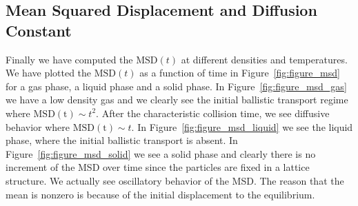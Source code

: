 \documentclass[twoside]{article}
\begin{document}
\subsection{Mean Squared Displacement and Diffusion Constant}
Finally we have computed the $\mathrm{MSD}(t)$ at different densities and temperatures. We have plotted the $\mathrm{MSD}(t)$ as a function of time in Figure~\ref{fig:figure_msd} for a gas phase, a liquid phase and a solid phase. In Figure~\ref{fig:figure_msd_gas} we have a low density gas and we clearly see the initial ballistic transport regime where $\mathrm{MSD(t)} \sim t^2$. After the characteristic collision time, we see diffusive behavior where $\mathrm{MSD(t)} \sim t$. In Figure~\ref{fig:figure_msd_liquid} we see the liquid phase, where the initial ballistic transport is absent. In Figure~\ref{fig:figure_msd_solid} we see a solid phase and clearly there is no increment of the MSD over time since the particles are fixed in a lattice structure. We actually see oscillatory behavior of the MSD. The reason that the mean is nonzero is because of the initial displacement to the equilibrium.
\end{document}
